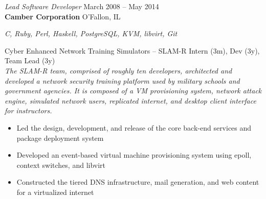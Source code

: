 \documentclass[margin,line]{resume}
\begin{document}
\begin{resume}
{\sl Lead Software Developer} \hfill
     March 2008 -- May 2014\\
     \textbf{Camber Corporation} \hfill
     O'Fallon, IL\\[4pt]
{\small\centering\textit{C, Ruby, Perl, Haskell, PostgreSQL, KVM, libvirt, Git}\par}\vspace*{-\baselineskip}
\vspace{4pt}
{\small Cyber Enhanced Network Training Simulators -- SLAM-R  \hfill  Intern (3m), Dev (3y), Team Lead (3y)}\\
{\small\textit{The SLAM-R team, comprised of roughly ten developers, architected and developed a network security
training platform used by military schools and government agencies. It is composed of a VM provisioning system, network
attack engine, simulated network users, replicated internet, and desktop client interface for instructors.}}
\begin{itemize} \itemsep -2pt %
\small\item Led the design, development, and release of the core back-end services and package deployment system
\small\item Developed an event-based virtual machine provisioning system using epoll, context switches, and libvirt
\small\item Constructed the tiered DNS infrastructure, mail generation, and web content for a virtualized internet

\end{itemize}
\end{resume}
\end{document}
